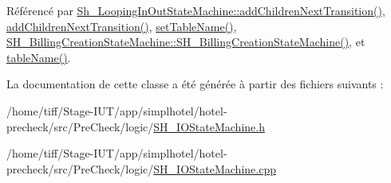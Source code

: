 Référencé par \hyperlink{classSh__LoopingInOutStateMachine_acfd8d0711c793b13c759f6c50be6a315}{Sh\-\_\-\-Looping\-In\-Out\-State\-Machine\-::add\-Children\-Next\-Transition()}, \hyperlink{classSH__InOutStateMachine_a689e5513ef6ef3fc1598efacd413372e}{add\-Children\-Next\-Transition()}, \hyperlink{classSH__InOutStateMachine_a437a730d07ddd15bd96314ab0b6cf40e}{set\-Table\-Name()}, \hyperlink{classSH__BillingCreationStateMachine_ad62b77fa4aeafe200056ff3974562f83}{S\-H\-\_\-\-Billing\-Creation\-State\-Machine\-::\-S\-H\-\_\-\-Billing\-Creation\-State\-Machine()}, et \hyperlink{classSH__InOutStateMachine_a18b07a985695100612bbcbda870933b4}{table\-Name()}.



La documentation de cette classe a été générée à partir des fichiers suivants \-:\begin{DoxyCompactItemize}
\item 
/home/tiff/\-Stage-\/\-I\-U\-T/app/simplhotel/hotel-\/precheck/src/\-Pre\-Check/logic/\hyperlink{SH__IOStateMachine_8h}{S\-H\-\_\-\-I\-O\-State\-Machine.\-h}\item 
/home/tiff/\-Stage-\/\-I\-U\-T/app/simplhotel/hotel-\/precheck/src/\-Pre\-Check/logic/\hyperlink{SH__IOStateMachine_8cpp}{S\-H\-\_\-\-I\-O\-State\-Machine.\-cpp}\end{DoxyCompactItemize}
